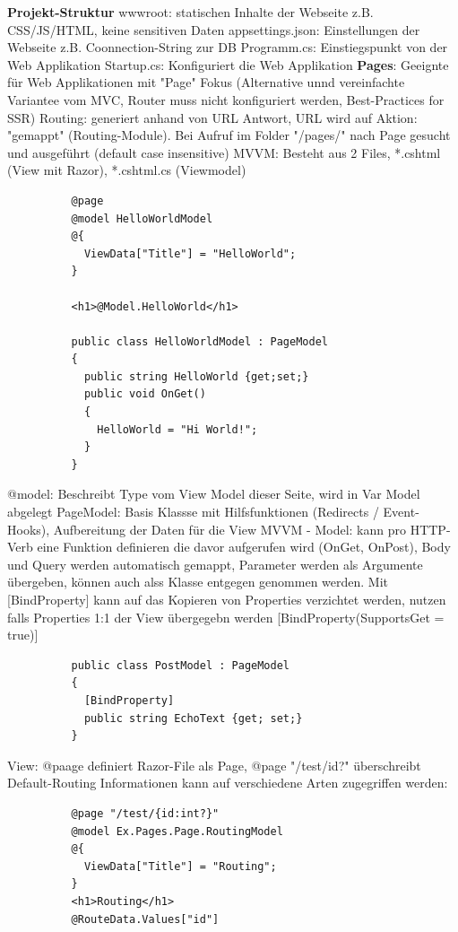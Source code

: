\documentclass[10pt,landscape]{article}
\begin{document}
\begin{multicols}{2}
        \textbf{Projekt-Struktur}
        wwwroot: statischen Inhalte der Webseite z.B. CSS/JS/HTML, keine sensitiven Daten
        appsettings.json: Einstellungen der Webseite z.B. Coonnection-String zur DB
        Programm.cs: Einstiegspunkt von der Web Applikation
        Startup.cs: Konfiguriert die Web Applikation 
        \textbf{Pages}: Geeignte für Web Applikationen mit "Page" Fokus (Alternative unnd vereinfachte Variantee vom MVC, Router muss nicht konfiguriert werden, Best-Practices for SSR)
        Routing: generiert anhand von URL Antwort, URL wird auf Aktion: "gemappt" (Routing-Module). Bei Aufruf im Folder "/pages/" nach Page gesucht und ausgeführt (default case insensitive)
        MVVM: Besteht aus 2 Files, *.cshtml (View mit Razor), *.cshtml.cs (Viewmodel)
        \begin{lstlisting}
          @page
          @model HelloWorldModel
          @{
            ViewData["Title"] = "HelloWorld";
          }

          <h1>@Model.HelloWorld</h1>

          public class HelloWorldModel : PageModel
          {
            public string HelloWorld {get;set;}
            public void OnGet()
            {
              HelloWorld = "Hi World!";
            }
          }
        \end{lstlisting}
        @model: Beschreibt Type vom View Model dieser Seite, wird in Var Model abgelegt
        PageModel: Basis Klassse mit Hilfsfunktionen (Redirects / Event-Hooks), Aufbereitung der Daten für die View
        MVVM - Model: kann pro HTTP-Verb eine Funktion definieren die davor aufgerufen wird (OnGet, OnPost), Body und Query werden automatisch gemappt, Parameter werden als Argumente übergeben, können auch alss Klasse entgegen genommen werden.
        Mit [BindProperty] kann auf das Kopieren von Properties verzichtet werden, nutzen falls Properties 1:1 der View übergegebn werden [BindProperty(SupportsGet = true)]
        \begin{lstlisting}
          public class PostModel : PageModel
          {
            [BindProperty]
            public string EchoText {get; set;}
          }
        \end{lstlisting}
        View: @paage definiert Razor-File als Page, @page "/test/{id?}" überschreibt Default-Routing Informationen
        kann auf verschiedene Arten zugegriffen werden:
        \begin{lstlisting}
          @page "/test/{id:int?}"
          @model Ex.Pages.Page.RoutingModel
          @{
            ViewData["Title"] = "Routing";
          }
          <h1>Routing</h1>
          @RouteData.Values["id"]


\end{lstlisting}
\end{multicols}
\end{document}
